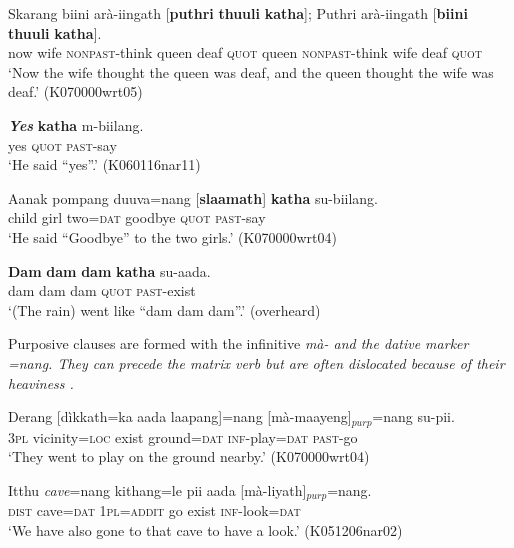 \ea\label{ex:form:katha:psych1}
\gll Skarang biini arà-iingath  [\textbf{puthri} \textbf{thuuli} \textbf{katha}]; Puthri arà-iingath [\textbf{biini} \textbf{thuuli} \textbf{katha}].\\
   now wife \textsc{nonpast}-think queen deaf \textsc{quot} queen \textsc{nonpast}-think wife deaf \textsc{quot} \\
    `Now the wife thought the queen was deaf, and the queen thought the wife was deaf.'  (K070000wrt05)
\z



\ea \label{ex:katha:interj1}
\gll \textbf{{\em Yes}}  \textbf{katha} m-biilang. \\
  yes \textsc{quot} \textsc{past}-say\\
`He said ``yes''.' (K060116nar11)
\z



\ea \label{ex:katha:interj2}
\gll Aanak pompang duuva=nang [\textbf{slaamath}] \textbf{katha} su-biilang. \\
     child girl two=\textsc{dat} goodbye \textsc{quot} \textsc{past}-say  \\
    `He said ``Goodbye'' to the two girls.'  (K070000wrt04)
\z




\ea \label{ex:katha:onom1}
\gll \textbf{Dam} \textbf{dam} \textbf{dam} \textbf{katha} su-aada. \\
     dam dam dam \textsc{quot} \textsc{past}-exist  \\
    `(The rain) went like ``dam dam dam''.'  (overheard)
\z


Purposive clauses are formed with the infinitive \em mà- \em and the dative marker \em =nang\em. They can precede the matrix verb  but are often dislocated because of their heaviness .

\ea\label{ex:cls:purp:pre}
\gll Derang [dìkkath=ka aada laapang]=nang [mà-maayeng]$_{purp}$=nang su-pii. \\ %
     3\textsc{pl} vicinity=\textsc{loc} exist ground=\textsc{dat} \textsc{inf}-play=\textsc{dat} \textsc{past}-go  \\
    `They went to play on the ground nearby.'  (K070000wrt04)
\z 

\ea\label{ex:cls:purp:post}
\gll Itthu   {\em cave}=nang kithang=le pii aada [mà-liyath]$_{purp}$=nang. \\ %
 \textsc{dist} cave=\textsc{dat} 1\textsc{pl}=\textsc{addit} go exist \textsc{inf}-look=\textsc{dat}    \\
    `We have also gone to that cave to have a look.'   (K051206nar02)
\z

